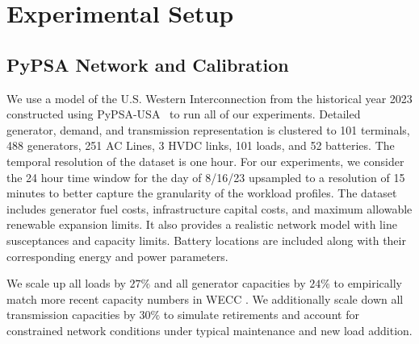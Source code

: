 \section{Experimental Setup}

\subsection{PyPSA Network and Calibration}
\label{sec:pypsa_network}

We use a model of the U.S. Western Interconnection from the historical year 2023 constructed using PyPSA-USA~\cite{tehranchi5029120pypsa} to run all of our experiments. Detailed generator, demand, and transmission representation is clustered to 101 terminals, 488 generators, 251 AC Lines, 3 HVDC links, 101 loads, and 52 batteries. The temporal resolution of the dataset is one hour. For our experiments, we consider the 24 hour time window for the day of 8/16/23 upsampled to a resolution of 15 minutes to better capture the granularity of the workload profiles. The dataset includes generator fuel costs, infrastructure capital costs, and maximum allowable renewable expansion limits. It also provides a realistic network model with line susceptances and capacity limits. Battery locations are included along with their corresponding energy and power parameters. 

We scale up all loads by $27\%$ and all generator capacities by $24\%$ to empirically match more recent capacity numbers in WECC \cite{eia or wecc or something}. We additionally scale down all transmission capacities by $30\%$ to simulate retirements and account for constrained network conditions under typical maintenance and new load addition.  

 
